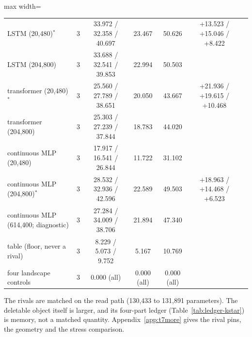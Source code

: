 \documentclass{article} %
\begin{document}
\begin{table}[t]
\begin{adjustbox}{max width=\linewidth}
\begin{tabular}{lcccccc}
LSTM (20,480)$^\ast$ & 3 & 33.972 / 32.358 / 40.697 & 23.467 & 50.626 & +13.523 / +15.046 / +8.422 & \\
LSTM (204,800) & 3 & 33.688 / 32.541 / 39.853 & 22.994 & 50.503 & & \\
transformer (20,480)$^\ast$ & 3 & 25.560 / 27.789 / 38.651 & 20.050 & 43.667 & +21.936 / +19.615 / +10.468 & \\
transformer (204,800) & 3 & 25.303 / 27.239 / 37.844 & 18.783 & 44.020 & & \\
continuous MLP (20,480) & 3 & 17.917 / 16.541 / 26.844 & 11.722 & 31.102 & & \\
continuous MLP (204,800)$^\ast$ & 3 & 28.532 / 32.936 / 42.596 & 22.589 & 49.503 & +18.963 / +14.468 / +6.523 & \\
continuous MLP (614,400; diagnostic) & 3 & 27.284 / 34.009 / 38.706 & 21.894 & 47.340 & & \\
table (floor, never a rival) & 3 & 8.229 / 5.073 / 9.752 & 5.167 & 10.769 & & \\
\midrule
four landscape controls & 3 & 0.000 (all) & 0.000 (all) & 0.000 (all) & & \\
\bottomrule
\end{tabular}\end{adjustbox}
\end{table}


\noindent The rivals are matched on the read path (130,433 to 131,891 parameters). The deletable
object itself is larger, and its four-part ledger (Table~\ref{tab:ledger-kstar}) is memory, not
a matched quantity. Appendix~\ref{app:t7more} gives the rival pins, the geometry and the stress
comparison. %
\end{document}
